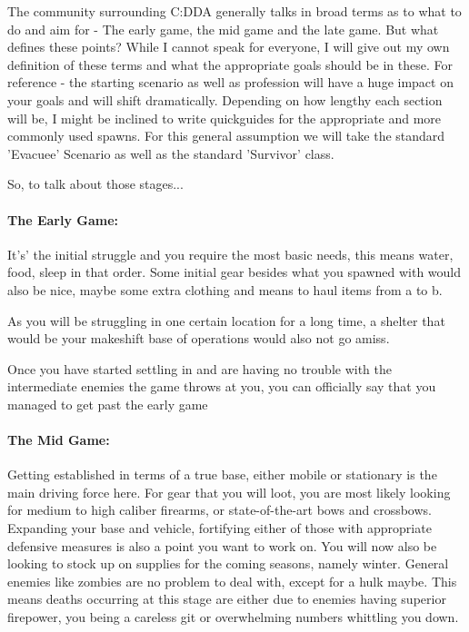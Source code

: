 \documentclass[11pt]{report}
\begin{document}
The community surrounding C:DDA generally talks in broad terms as to what to do and aim for - The early game, the mid game and the late game. But what defines these points? While I cannot speak for everyone, I will give out my own definition of these terms and what the appropriate goals should be in these. For reference - the starting scenario as well as profession will have a huge impact on your goals and will shift dramatically. Depending on how lengthy each section will be, I might be inclined to write quickguides for the appropriate and more commonly used spawns. For this general assumption we will take the standard 'Evacuee' Scenario as well as the standard 'Survivor' class.

So, to talk about those stages...

\paragraph{The Early Game:}
It's' the initial struggle and you require the most basic needs, this means water, food, sleep in that order. Some initial gear besides what you spawned with would also be nice, maybe some extra clothing and means to haul items from a to b.

As you will be struggling in one certain location for a long time, a shelter that would be your makeshift base of operations would also not go amiss.

Once you have started settling in and are having no trouble with the intermediate enemies the game throws at you, you can officially say that you managed to get past the early game

\paragraph{The Mid Game:}
Getting established in terms of a true base, either mobile or stationary is the main driving force here. For gear that you will loot, you are most likely looking for medium to high caliber firearms, or state-of-the-art bows and crossbows. Expanding your base and vehicle, fortifying either of those with appropriate defensive measures is also a point you want to work on. You will now also be looking to stock up on supplies for the coming seasons, namely winter. General enemies like zombies are no problem to deal with, except for a hulk maybe. This means deaths occurring at this stage are either due to enemies having superior firepower, you being a careless git or overwhelming numbers whittling you down.
\end{document}
